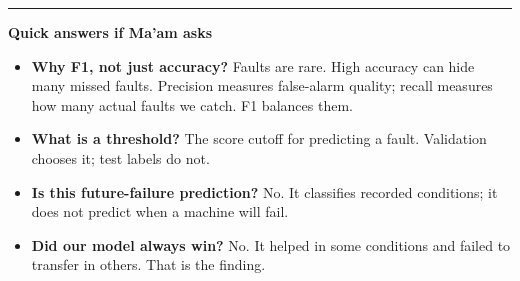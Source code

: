 \documentclass[11pt,a4paper]{article}
\begin{document}
\hrule
\vspace{4pt}
\textbf{Quick answers if Ma'am asks}
\begin{itemize}
\item \textbf{Why F1, not just accuracy?} Faults are rare. High accuracy can hide many missed faults. Precision measures false-alarm quality; recall measures how many actual faults we catch. F1 balances them.
\item \textbf{What is a threshold?} The score cutoff for predicting a fault. Validation chooses it; test labels do not.
\item \textbf{Is this future-failure prediction?} No. It classifies recorded conditions; it does not predict when a machine will fail.
\item \textbf{Did our model always win?} No. It helped in some conditions and failed to transfer in others. That is the finding.
\end{itemize}
\end{document}
